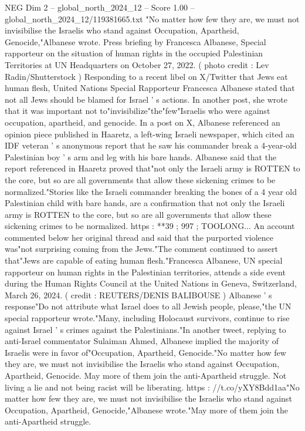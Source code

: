 \begin{textsample}{NEG Dim 2 – global\_north\_2024\_12 – Score 1.00 – global\_north\_2024\_12/119381665.txt}  \label{ex:f2_neg_169}
"No matter how few they are, we must not invisibilise the Israelis who stand against Occupation, Apartheid, Genocide,"Albanese wrote.
Press briefing by Francesca Albanese, Special rapporteur on the situation of human rights in the occupied Palestinian Territories at UN Headquarters on October 27, 2022. ( photo credit : Lev Radin/Shutterstock ) Responding to a recent libel on X/Twitter that Jews eat human flesh, United Nations Special Rapporteur Francesca Albanese stated that not all Jews should be blamed for Israel ' s actions.
In another post, she wrote that it was important not to"invisibilize"the"few"Israelis who were against occupation, apartheid, and genocide.
In a post on X, Albanese referenced an opinion piece published in Haaretz, a left-wing Israeli newspaper, which cited an IDF veteran ' s anonymous report that he saw his commander break a 4-year-old Palestinian boy ' s arm and leg with his bare hands.
Albanese said that the report referenced in Haaretz proved that"not only the Israeli army is ROTTEN to the core, but so are all governments that allow these sickening crimes to be normalized."Stories like the Israeli commander breaking the bones of a 4 year old Palestinian child with bare hands, are a confirmation that not only the Israeli army is ROTTEN to the core, but so are all governments that allow these sickening crimes to be normalized. https : **39 ; 997 ; TOOLONG...
An account commented below her original thread and said that the purported violence was"not surprising coming from the Jews."The comment continued to assert that"Jews are capable of eating human flesh."Francesca Albanese, UN special rapporteur on human rights in the Palestinian territories, attends a side event during the Human Rights Council at the United Nations in Geneva, Switzerland, March 26, 2024. ( credit : REUTERS/DENIS BALIBOUSE ) Albanese ' s response"Do not attribute what Israel does to all Jewish people, please,"the UN special rapporteur wrote."Many, including Holocaust survivors, continue to rise against Israel ' s crimes against the Palestinians."In another tweet, replying to anti-Israel commentator Sulaiman Ahmed, Albanese implied the majority of Israelis were in favor of"Occupation, Apartheid, Genocide."No matter how few they are, we must not invisibilise the Israelis who stand against Occupation, Apartheid, Genocide.
May more of them join the anti-Apartheid struggle.
Not living a lie and not being racist will be liberating. https : //t.co/yXY8Bdd1aa"No matter how few they are, we must not invisibilise the Israelis who stand against Occupation, Apartheid, Genocide,"Albanese wrote."May more of them join the anti-Apartheid struggle.

\end{textsample}

